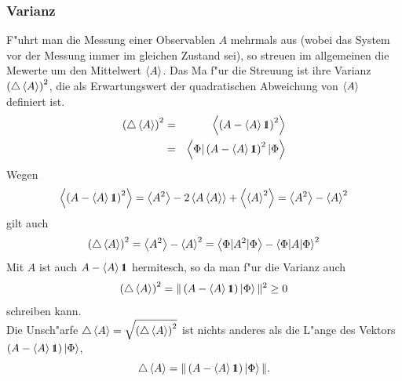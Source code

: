       \subsubsection{Varianz}
         F"uhrt man die Messung einer Observablen $A$ mehrmals aus (wobei das System vor der Messung immer im gleichen Zustand sei), so streuen im allgemeinen die
         Me\3werte um den Mittelwert $\mean{A}$. Das Ma\3 f"ur die Streuung ist ihre Varianz $\var{A}$, die als Erwartungswert der quadratischen Abweichung von $\mean{A}$
         definiert ist.
         \begin{eqnarray*}
            \var{A} & = & \mean{\left( A-\mean{A}\id\right)^2} \\
                    & = & \scalar{\Phi}{\left( A-\mean{A}\id\right)^2}{\Phi}
         \end{eqnarray*}
         Wegen
         $$ \mean{\left( A-\mean{A}\id\right)^2} = \mean{A^2} - 2\mean{A\mean{A}} + \mean{\mean{A}^2} = \mean{A^2} - \mean{A}^2 $$
         gilt auch
         $$ \var{A} = \mean{A^2} - \mean{A}^2 = \scalar{\Phi}{A^2}{\Phi} - \scalar{\Phi}{A}{\Phi}^2 $$
         Mit $A$ ist auch $A-\mean{A}\id$ hermitesch, so da\3 man f"ur die Varianz auch
         $$ \var{A} = \norm{\left(A-\mean{A}\id\right)\ket{\Phi}}^2 \ge 0 $$
         schreiben kann. \\
         Die Unsch"arfe $\unscharf{A} = \sqrt{\var{A}}$ ist nichts anderes als die L"ange des Vektors $\left(A-\mean{A}\id\right)\ket{\Phi}$,
         $$ \unscharf{A} = \norm{\left(A-\mean{A}\id\right)\ket{\Phi}}. $$
